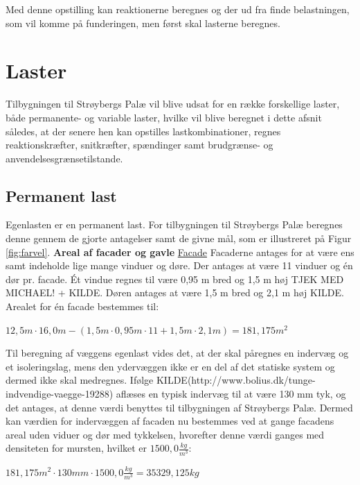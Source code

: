 Med denne opstilling kan reaktionerne beregnes og der ud fra finde belastningen, som vil komme på funderingen, men først skal lasterne beregnes.

\section{Laster}
Tilbygningen til Strøybergs Palæ vil blive udsat for en række forskellige laster, både permanente- og variable laster, hvilke vil blive beregnet i dette afsnit således, at der senere hen kan opstilles lastkombinationer, regnes reaktionskræfter, snitkræfter, spændinger samt brudgrænse- og anvendelsesgrænsetilstande.

\subsection{Permanent last}
Egenlasten er en permanent last. For tilbygningen til Strøybergs Palæ beregnes denne gennem de gjorte antagelser samt de givne mål, som er illustreret på Figur \ref{fig:farvel}.
\newline
\newline
\textbf{Areal af facader og gavle}
\newline
\newline
\underline{Facade}
Facaderne antages for at være ens samt indeholde lige mange vinduer og døre. Der antages at være 11 vinduer og én dør pr. facade. 
\newline \indent{     }  Ét vindue regnes til være 0,95 m bred og 1,5 m høj TJEK MED MICHAEL! + KILDE. Døren antages at være 1,5 m bred og 2,1 m høj KILDE. Arealet for én facade bestemmes til:
\begin{center}
	$12,5 m\cdot 16,0 m - (1,5 m\cdot0,95 m\cdot11 + 1,5 m\cdot 2,1 m)=181,175 m^2$
\end{center}

Til beregning af væggens egenlast vides det, at der skal påregnes en indervæg og et isoleringslag, mens den ydervæggen ikke er en del af det statiske system og dermed ikke skal medregnes.
\newline \indent{     }  Ifølge KILDE(http://www.bolius.dk/tunge-indvendige-vaegge-19288) aflæses en typisk indervæg til at være 130 mm tyk, og det antages, at denne værdi benyttes til tilbygningen af Strøybergs Palæ. Dermed kan værdien for indervæggen af facaden nu bestemmes ved at gange facadens areal uden viduer og dør med tykkelsen, hvorefter denne værdi ganges med densiteten for mursten, hvilket er $1500,0 \frac{kg}{m^3}$:
\begin{center}
	$181,175 m^2\cdot 130 mm\cdot 1500,0 \frac{kg}{m^3}=35329,125 kg$
\end{center}

